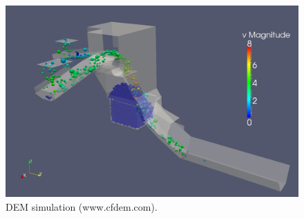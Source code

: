 \begin{figure}[!htb]
\centering
\includegraphics[width=.70\columnwidth]{images/061cfdemsim}
\caption[DEM simulation]{DEM simulation (www.cfdem.com).}
\label{fig:061cfdemsim}
\end{figure}